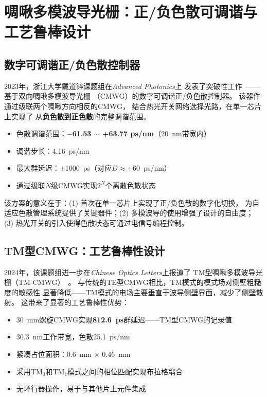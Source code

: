 \documentclass[12pt,a4paper,twoside]{article}
\begin{document}
\newpage

\section{啁啾多模波导光栅：正/负色散可调谐与工艺鲁棒设计}

\subsection{数字可调谐正/负色散控制器}

2023年，浙江大学戴道锌课题组在\textit{Advanced Photonics}上
发表了突破性工作~\cite{liu2023advphoton}——基于双向啁啾多模波导光栅
（CMWG）的数字可调谐正/负色散控制器。
该器件通过级联两个啁啾方向相反的CMWG，
结合热光开关网络选择光路，在单一芯片上实现了
从\textbf{负色散到正色散}的完整调谐范围。

\begin{itemize}[leftmargin=*,itemsep=2pt]
\item 色散调谐范围：\textbf{$-$61.53 $\sim$ +63.77 ps/nm}（20~nm带宽内）
\item 调谐步长：4.16~ps/nm
\item 最大群延迟：$\pm$1000~ps（对应$D \approx \pm 60$~ps/nm）
\item 通过级联$N$级CMWG实现$2^N$个离散色散状态
\end{itemize}

该方案的意义在于：(1) 首次在单一芯片上实现了正/负色散的数字化切换，
为自适应色散管理系统提供了关键器件；(2) 多模波导的使用增强了设计的自由度；
(3) 热光开关的引入使得色散状态可通过电信号编程控制。

\subsection{TM型CMWG：工艺鲁棒性设计}

2024年，该课题组进一步在\textit{Chinese Optics Letters}上报道了
TM型啁啾多模波导光栅（TM-CMWG）~\cite{liu2024col}。
与传统的TE型CMWG相比，TM模式的模式场对侧壁粗糙度的敏感性
显著降低——TM模式的电场主要垂直于波导侧壁界面，减少了侧壁散射。
这带来了显著的工艺鲁棒性优势：

\begin{itemize}[leftmargin=*,itemsep=2pt]
\item 30~mm螺旋CMWG实现\textbf{812.6~ps}群延迟——TM型CMWG的记录值
\item 30.3~nm工作带宽，色散25.1~ps/nm
\item 紧凑占位面积：0.6~mm $\times$ 0.46~mm
\item 采用TM$_0$和TM$_1$模式之间的相位匹配实现布拉格耦合
\item 无环行器操作，易于与其他片上元件集成
\end{itemize}
\end{document}
